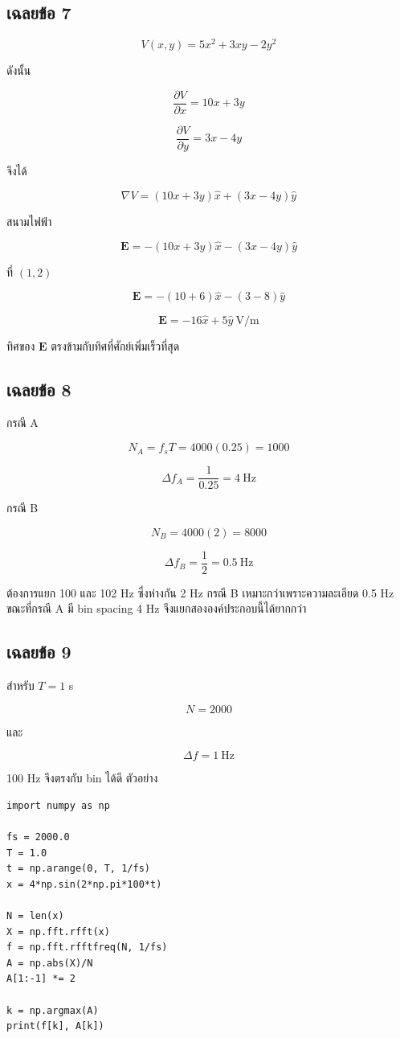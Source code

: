 \subsection{เฉลยข้อ 7}

\[
V(x,y)=5x^2+3xy-2y^2
\]

ดังนั้น

\[
\frac{\partial V}{\partial x}=10x+3y
\]

\[
\frac{\partial V}{\partial y}=3x-4y
\]

จึงได้

\[
\nabla V=(10x+3y)\hat x+(3x-4y)\hat y
\]

สนามไฟฟ้า

\[
\mathbf{E}=-(10x+3y)\hat x-(3x-4y)\hat y
\]

ที่ $(1,2)$

\[
\mathbf{E}=-(10+6)\hat x-(3-8)\hat y
\]

\[
\boxed{\mathbf{E}=-16\hat x+5\hat y\ \text{V/m}}
\]

ทิศของ $\mathbf{E}$ ตรงข้ามกับทิศที่ศักย์เพิ่มเร็วที่สุด

\subsection{เฉลยข้อ 8}

กรณี A

\[
N_A=f_sT=4000(0.25)=1000
\]

\[
\Delta f_A=\frac{1}{0.25}=4\ \text{Hz}
\]

กรณี B

\[
N_B=4000(2)=8000
\]

\[
\Delta f_B=\frac{1}{2}=0.5\ \text{Hz}
\]

ต้องการแยก 100 และ 102 Hz ซึ่งห่างกัน 2 Hz กรณี B เหมาะกว่าเพราะความละเอียด 0.5 Hz ขณะที่กรณี A มี bin spacing 4 Hz จึงแยกสององค์ประกอบนี้ได้ยากกว่า

\subsection{เฉลยข้อ 9}

สำหรับ $T=1$ s

\[
N=2000
\]

และ

\[
\Delta f=1\ \text{Hz}
\]

100 Hz จึงตรงกับ bin ได้ดี ตัวอย่าง

\begin{verbatim}
import numpy as np

fs = 2000.0
T = 1.0
t = np.arange(0, T, 1/fs)
x = 4*np.sin(2*np.pi*100*t)

N = len(x)
X = np.fft.rfft(x)
f = np.fft.rfftfreq(N, 1/fs)
A = np.abs(X)/N
A[1:-1] *= 2

k = np.argmax(A)
print(f[k], A[k])
\end{verbatim}


